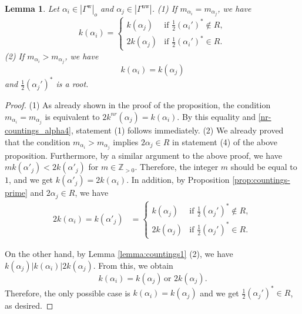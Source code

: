 \documentclass[11pt]{amsart}
\newcommand{\Z}{\mathbb{Z}}
\newcommand{\w}{\mathrm{w}}
\newcommand{\nw}{\mathrm{nw}}
\newtheorem{lemma}[thm]{Lemma}%
\begin{document}
{\begin{lemma}\label{lemma:9.5}
Let $\alpha_i\in |\Gamma^\w|_o$ and $\alpha_j\in |\Gamma^\nw|$. 
\vskip 1mm
\noindent
{\rm (1)} If $m_{\alpha_i}=m_{\alpha_j}$, we have 
\begin{equation}
k(\alpha_i)=\begin{cases}
k(\alpha_j) & \text{if $\frac12 (\alpha_i')^\ast\not \in R$},\\
2k(\alpha_j) & \text{if $\frac12 (\alpha_i')^\ast \in R$}.
\end{cases}
\end{equation}
{\rm (2)} If $m_{\alpha_i}>m_{\alpha_j}$,
we have
\begin{equation}\label{collapsed-black}
k(\alpha_i)=k(\alpha_j)
\end{equation}
and $\frac12(\alpha_j')^\ast$ is a root.
\end{lemma}
\begin{proof}
(1) As already shown in the proof of the proposition, the condition
$m_{\alpha_i}=m_{\alpha_j}$ is equivalent to $2k^{nr}(\alpha_j)=k(\alpha_i)$.
By this equality and \eqref{nr-countings_alpha4}, statement (1) follows
immediately. 
\vskip 1mm
\noindent
(2) We already proved  that the condition $m_{\alpha_i}>m_{\alpha_j}$ implies
$2\alpha_j\in R$ in statement (4) of the above proposition.
Furthermore, by a similar argument to the above proof, we have
$mk(\alpha'_j)<2k(\alpha'_j)$ for $m\in \Z_{>0}$.
Therefore, the integer $m$ should be equal to $1$, and we get  
$k(\alpha'_j)=2 k(\alpha_i)$.  
In addition, by Proposition \ref{prop:countings-prime} and 
$2\alpha_j \in R$, we have 
\begin{align*}
2k(\alpha_i)=k(\alpha'_j)
&=\begin{cases}
k(\alpha_j) & \text{if }\frac12 (\alpha_j')^\ast\not\in R,\\
2k(\alpha_j) & \text{if }\frac12 (\alpha_j')^\ast\in R.
\end{cases}
\end{align*}

On the other hand, by {Lemma \ref{lemma:countings1}} (2), we have
$k(\alpha_j)|k(\alpha_i)|2k(\alpha_j)$. From this, we obtain
\[k(\alpha_i)=k(\alpha_j)\,\text{or}\,\, 2k(\alpha_j).\]
Therefore, the only possible case is $k(\alpha_i)=k(\alpha_j)$ and we get 
$\frac12 (\alpha_j' )^\ast\in R$, as desired.
\end{proof}
}
\end{document}
